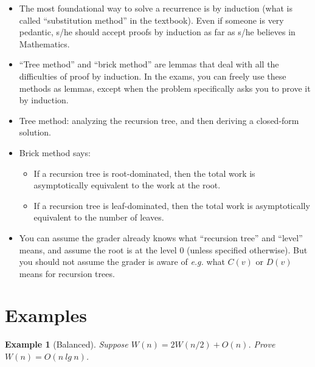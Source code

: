 \documentclass[11pt,a4paper,oneside,microtype,chapter,nokorean]{oblivoir}
\newtheorem{example}{Example}
\begin{document}
\begin{itemize}
\item The most foundational way to solve a recurrence is by induction (what is called ``substitution
  method'' in the textbook).  Even if someone is very pedantic, s/he should accept proofs by
  induction as far as s/he believes in Mathematics.

\item ``Tree method'' and ``brick method'' are lemmas that deal with all the difficulties of proof
  by induction.  In the exams, you can freely use these methods as lemmas, except when the problem
  specifically asks you to prove it by induction.

\item Tree method: analyzing the recursion tree, and then deriving a closed-form solution.

\item Brick method says:
  \begin{itemize}
  \item If a recursion tree is root-dominated, then the total work is asymptotically equivalent to
    the work at the root.
  \item If a recursion tree is leaf-dominated, then the total work is asymptotically equivalent to
    the number of leaves.
  \end{itemize}

\item You can assume the grader already knows what ``recursion tree'' and ``level'' means, and
  assume the root is at the level $0$ (unless specified otherwise).  But you should not assume the
  grader is aware of \emph{e.g.} what $C(v)$ or $D(v)$ means for recursion trees.
\end{itemize}


\section{Examples}
\label{sec:examples}


\begin{example}[Balanced] Suppose $W(n) = 2W(n/2) + O(n)$.  Prove $W(n) = O(n~lg~n)$.
\end{example}
\end{document}
